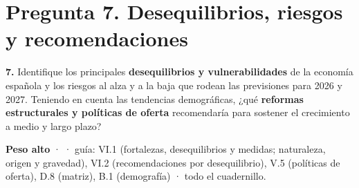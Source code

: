 \clearpage
\section*{Pregunta 7. Desequilibrios, riesgos y recomendaciones}

\begin{enunciado}
\textbf{7.} Identifique los principales \textbf{desequilibrios y vulnerabilidades} de la economía española y los riesgos al alza y a la baja que rodean las previsiones para 2026 y 2027. Teniendo en cuenta las tendencias demográficas, ¿qué \textbf{reformas estructurales y políticas de oferta} recomendaría para sostener el crecimiento a medio y largo plazo?

\smallskip
\textbf{Peso alto} ·  · guía: VI.1 (fortalezas, desequilibrios y medidas; naturaleza, origen y gravedad), VI.2 (recomendaciones por desequilibrio), V.5 (políticas de oferta), D.8 (matriz), B.1 (demografía) · todo el cuadernillo.
\end{enunciado}

